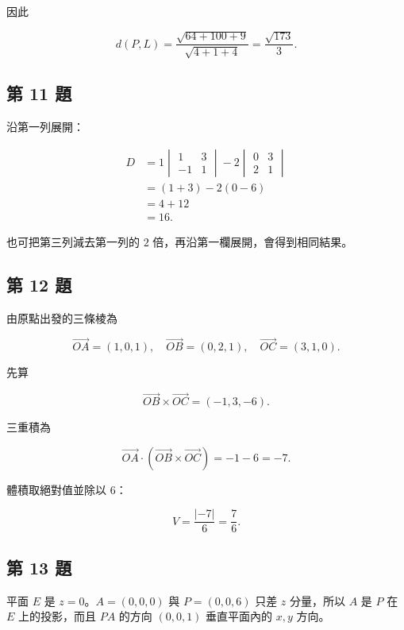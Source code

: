 \documentclass[11pt,a4paper]{article}
\begin{document}
因此

\[
d(P,L)
=\frac{\sqrt{64+100+9}}{\sqrt{4+1+4}}
=\boxed{\frac{\sqrt{173}}3}.
\]

\subsection{第 11 題}\label{ux7b2c-11-ux984c}

沿第一列展開：

\[
\begin{aligned}
D
&=1
\begin{vmatrix}1&3\\-1&1\end{vmatrix}
-2
\begin{vmatrix}0&3\\2&1\end{vmatrix}\\
&=(1+3)-2(0-6)\\
&=4+12\\
&=\boxed{16}.
\end{aligned}
\]

也可把第三列減去第一列的 \(2\) 倍，再沿第一欄展開，會得到相同結果。

\subsection{第 12 題}\label{ux7b2c-12-ux984c}

由原點出發的三條棱為

\[
\overrightarrow{OA}=(1,0,1),\quad
\overrightarrow{OB}=(0,2,1),\quad
\overrightarrow{OC}=(3,1,0).
\]

先算

\[
\overrightarrow{OB}\times\overrightarrow{OC}
=(-1,3,-6).
\]

三重積為

\[
\overrightarrow{OA}\cdot
(\overrightarrow{OB}\times\overrightarrow{OC})
=-1-6=-7.
\]

體積取絕對值並除以 \(6\)：

\[
\boxed{V=\frac{|{-7}|}{6}=\frac76}.
\]

\subsection{第 13 題}\label{ux7b2c-13-ux984c}

平面 \(E\) 是 \(z=0\)。\(A=(0,0,0)\) 與 \(P=(0,0,6)\) 只差 \(z\) 分量，所以 \(A\) 是 \(P\) 在 \(E\) 上的投影，而且 \(PA\) 的方向 \((0,0,1)\) 垂直平面內的 \(x,y\) 方向。
\end{document}
